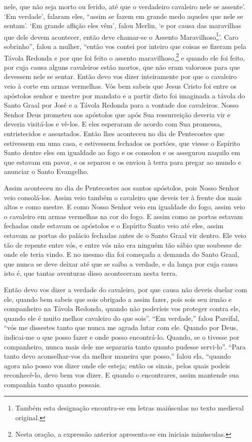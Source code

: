 nele, que não seja morto ou ferido, até que o verdadeiro cavaleiro nele se
assente’. ‘Em verdade’, falaram eles, “assim se fazem em grande medo aqueles
que nele se sentam’. ‘Em grande aflição eles vêm’, falou Merlin, ‘e por causa
das maravilhas que dele devem acontecer, então deve chamar-se o Assento
Maravilhoso\footnote{ Também esta designação encontra-se em letras maiúsculas
no texto medieval original.}’. Caro sobrinho”, falou a mulher,
“então vos contei por inteiro que coisas se fizeram pela Távola Redonda e por
que foi feito o assento maravilhoso,\footnote{ Nesta oração, a expressão
anterior apresenta-se em iniciais minúsculas.}  e quando ele foi
feito, por cuja causa alguns cavaleiros estão mortos, que não eram valorosos
para que devessem nele se sentar. Então devo vos dizer inteiramente por que o
cavaleiro veio à corte em armas vermelhas. Vós bem sabeis que Jesus Cristo foi
entre os apóstolos senhor e mestre por mandato e a partir disto foi imaginada a
távola do Santo Graal por José e a Távola Redonda para a vontade dos
cavaleiros. Nosso Senhor Deus prometeu aos apóstolos que após Sua ressurreição
deveria vir e deveria visitá-los e vê-los. E eles esperaram de acordo com Sua
promessa, entristecidos e assustados. Então lhes aconteceu no dia de
Pentecostes que estivessem em uma casa, e estivessem fechados os portões, que
viesse o Espírito Santo dentre eles em igualdade ao fogo e os consolou e os
assegurou naquilo em que estavam em pavor, e os separou e os enviou à terra
para pregar ao mundo e anunciar o Santo Evangelho.

Assim aconteceu no dia de Pentecostes aos santos apóstolos, pois Nosso
Senhor veio consolá-los. Assim veio também o cavaleiro que deveis ter à frente
dos mais altos e como mestre.  E como Nosso Senhor veio em igualdade do fogo,
assim veio o cavaleiro em armas vermelhas na cor do fogo. E assim como as
portas estavam fechadas onde estavam os apóstolos e o Espírito Santo veio até
eles, assim estavam as portas do palácio fechadas antes de o Santo Graal vir
dentro. Ele veio tão de repente entre vós, e entre vós não era ninguém tão
sábio que soubesse de onde ele teria vindo. E no mesmo dia foi começada a
demanda do Santo Graal, que nunca se deve deixar até que se saiba a verdade, e
da lança por cuja causa isto é, que tantas aventuras disso aconteceram nesta
terra. 

Então devo vos dizer a verdade do cavaleiro, por que causa não deveis duelar
com ele, quando bem sabeis que sois obrigado a assim fazer, pois sois seu irmão
e companheiro na Távola Redonda, quando não poderíeis vos proteger contra ele,
quando ele é muito melhor cavaleiro do que sois”. “Em
verdade,” falou Parsifal, “vós me dissestes tanto que nunca me agrada lutar
com ele. Quando por Deus, indicai-me o que posso fazer e onde posso
encontrá-lo. Quando, se o tivesse por companheiro, nunca mais dele me separaria
tanto quanto pudesse servi-lo”. “Para tanto devo aconselhar-vos da
melhor maneira que posso,” falou ela, “quando agora não posso vos dizer onde
ele esteja; então os sinais, pelos quais podeis reconhecê-lo, devo bem vos
dizer. E quando o encontrares, assim mantende sua companhia tanto quanto
possais. 

